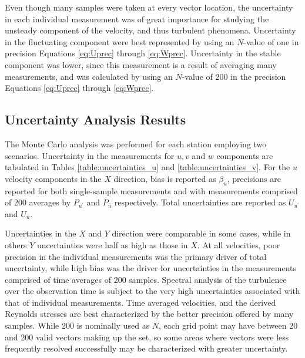 

Even though many samples were taken at every vector location, the uncertainty 
in each individual measurement was of great importance for studying the 
unsteady component of the velocity, and thus turbulent phenomena. Uncertainty 
in the fluctuating component were best represented by using an $N$-value of one 
in precision Equations \ref{eq:Uprec} through \ref{eq:Wprec}. 
Uncertainty in the stable component was lower, since this measurement is a 
result of averaging many measurements, and was calculated by using an $N$-value 
of 200 in the precision Equations \ref{eq:Uprec} through \ref{eq:Wprec}.

\clearpage
\subsection{Uncertainty Analysis Results}
The Monte Carlo analysis was performed for each station employing two 
scenarios. Uncertainty in the measurements for $u, v$ and $w$ 
components are tabulated in Tables \ref{table:uncertainties_u} and 
\ref{table:uncertainties_v}. For the $u$ velocity components in the $X$ 
direction, bias is reported as $\beta_u$, 
precisions are reported for both single-sample measurements and with 
measurements comprised of 200 averages by $P_{u^\prime}$ and $P_{\bar{u}}$ 
respectively. Total uncertainties are reported as $U_{u^\prime}$ and 
$U_{\bar{u}}$. 




Uncertainties in 
the $X$ and $Y$ direction were comparable in some cases, while in others $Y$ 
uncertainties were half as high as those in $X$. At all velocities, poor 
precision in the individual measurements was the primary driver of total 
uncertainty, while high bias was the driver for uncertainties in the 
measurements comprised of time averages of 200 samples. Spectral analysis of 
the turbulence over the observation time is subject to the very high 
uncertainties associated with that of individual measurements. Time averaged 
velocities, and the derived Reynolds stresses are best characterized by the 
better precision offered by many samples. While 200 is nominally used as $N$, 
each grid point may have between 20 and 200 valid vectors making up the set, so 
some areas where vectors were less frequently resolved successfully may be 
characterized with greater uncertainty.

